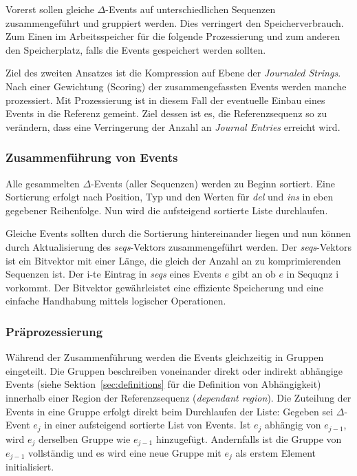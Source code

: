 \documentclass[12pt]{article}
\begin{document}
Vorerst sollen gleiche $\Delta$-Events auf unterschiedlichen Sequenzen zusammengeführt und gruppiert werden. Dies verringert den Speicherverbrauch. Zum Einen im Arbeitsspeicher für die folgende Prozessierung und zum anderen den Speicherplatz, falls die Events gespeichert werden sollten.

Ziel des zweiten Ansatzes ist die Kompression auf Ebene der \textit{Journaled Strings}. Nach einer Gewichtung (Scoring) der zusammengefassten Events werden manche prozessiert. Mit Prozessierung ist in diesem Fall der eventuelle Einbau eines Events in die Referenz gemeint. Ziel dessen ist es, die Referenzsequenz so zu verändern, dass eine Verringerung der Anzahl an \textit{Journal Entries} erreicht wird.

\subsubsection{Zusammenführung von Events}
Alle gesammelten $\Delta$-Events (aller Sequenzen) werden zu Beginn sortiert. Eine Sortierung erfolgt nach Position, Typ und den Werten für \textit{del} und \textit{ins} in eben gegebener Reihenfolge. Nun wird die aufsteigend sortierte Liste durchlaufen. 

Gleiche Events sollten durch die Sortierung hintereinander liegen und nun können durch Aktualisierung des \textit{seqs}-Vektors zusammengeführt werden. Der \textit{seqs}-Vektors ist ein Bitvektor mit einer Länge, die gleich der Anzahl an zu komprimierenden Sequenzen ist. Der i-te Eintrag in \textit{seqs} eines Events $e$ gibt an ob $e$ in Sequqnz i vorkommt. Der Bitvektor gewährleistet eine effiziente Speicherung und eine einfache Handhabung mittels logischer Operationen.

\subsubsection{Präprozessierung}
Während der Zusammenführung werden die Events gleichzeitig in Gruppen eingeteilt. Die Gruppen beschreiben voneinander direkt oder indirekt abhängige Events (siehe Sektion~\ref{sec:definitions} für die Definition von Abhängigkeit) innerhalb einer Region der Referenzsequenz (\textit{dependant region}). 
Die Zuteilung der Events in eine Gruppe erfolgt direkt beim Durchlaufen der Liste: Gegeben sei $\Delta$-Event $e_{j}$ in einer aufsteigend sortierte List von Events. Ist $e_{j}$ abhängig von $e_{j-1}$, wird $e_{j}$ derselben Gruppe wie $e_{j-1}$ hinzugefügt. Andernfalls ist die Gruppe von $e_{j-1}$ vollständig und es wird eine neue Gruppe mit $e_{j}$ als erstem Element initialisiert. 
\end{document}
